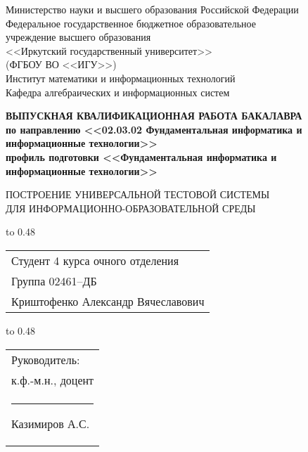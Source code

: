 \thispagestyle{empty}
\begin{center}
Министерство науки и высшего образования Российской Федерации\\
Федеральное государственное бюджетное образовательное\\
учреждение высшего образования\\
<<Иркутский государственный университет>>\\
(ФГБОУ ВО <<ИГУ>>)\\
Институт математики и информационных технологий\\
Кафедра алгебраических и информационных систем\\
\end{center}

\vspace{2.7cm}

\begin{center}
{\bf 
ВЫПУСКНАЯ КВАЛИФИКАЦИОННАЯ РАБОТА
БАКАЛАВРА\\[1mm]
по направлению <<02.03.02 Фундаментальная информатика и \\[1mm]
информационные технологии>>\\[1mm]
профиль подготовки <<Фундаментальная информатика и \\[1mm] информационные технологии>>
}  

\vspace{0.9cm}

{
ПОСТРОЕНИЕ УНИВЕРСАЛЬНОЙ 
ТЕСТОВОЙ СИСТЕМЫ\\[1mm]
ДЛЯ ИНФОРМАЦИОННО-ОБРАЗОВАТЕЛЬНОЙ СРЕДЫ 
} %
\end{center}

\vspace{1.8cm}

{
\noindent\hbox to 0.48\textwidth {%
	\mbox{ } \hfil} %
	\begin{tabular}[t]{l}
		Студент 4 курса очного отделения\\
		Группа 02461--ДБ\\
		Криштофенко Александр 
		Вячеславович		
	\end{tabular}		
}

\vspace{0.8cm}

{
\noindent\hbox to 0.48\textwidth {%
	\mbox{ } \hfil} %
	\begin{tabular}[t]{l}
		Руководитель:\\ к.ф.-м.н., доцент\\
		\rule{2.7cm}{0.5pt} Казимиров А.С.		
	\end{tabular}		
}

